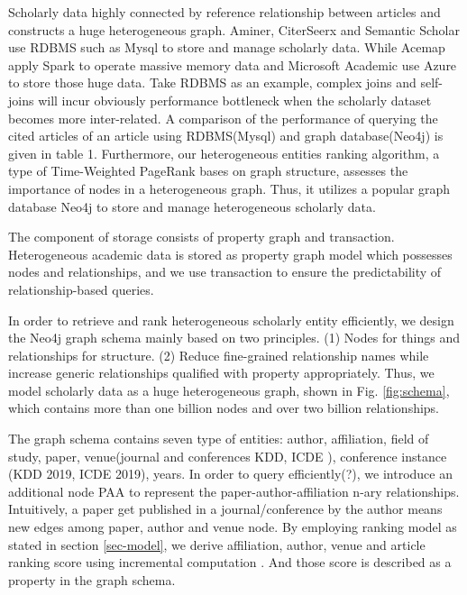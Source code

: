 Scholarly data highly connected by reference relationship between articles and constructs a huge heterogeneous graph. Aminer, CiterSeerx and Semantic Scholar use RDBMS such as Mysql to store and manage scholarly data. While Acemap apply Spark to operate massive memory data and Microsoft Academic use Azure to store those huge data. Take RDBMS as an example, complex joins and self-joins will incur obviously performance bottleneck when the scholarly dataset becomes more inter-related. A comparison of the performance of querying the cited articles of an article using RDBMS(Mysql) and graph database(Neo4j) is given in table 1. Furthermore, our heterogeneous entities ranking algorithm, a type of Time-Weighted PageRank bases on graph structure, assesses the importance of nodes in a heterogeneous graph. Thus, it utilizes a popular graph database Neo4j to store and manage heterogeneous scholarly data.

\par
The component of storage consists of property graph and transaction. Heterogeneous academic data is stored as property graph model which possesses nodes and relationships, and we use transaction to ensure the predictability of relationship-based queries.

\par
In order to retrieve and rank heterogeneous scholarly entity efficiently, we design the Neo4j graph schema mainly based on two principles. (1) Nodes for things and relationships for structure. (2) Reduce fine-grained relationship names while increase generic relationships qualified with property appropriately. Thus, we model scholarly data as a huge heterogeneous graph, shown in Fig. \ref{fig:schema}, which contains more than one billion nodes and over two billion relationships.

\par
The graph schema contains seven type of entities: author, affiliation, field of study, paper, venue(journal and conferences \eg KDD, ICDE ), conference instance (\eg KDD 2019, ICDE 2019), years. In order to query efficiently(?), we introduce an additional node PAA to represent the paper-author-affiliation n-ary relationships. Intuitively, a paper get published in a journal/conference by the author means new edges among paper, author and venue node. By employing ranking model as stated in section \ref{sec-model}, we derive affiliation, author, venue and article ranking score using incremental computation \cite{ma2018query}. And those score is described as a property in the graph schema.

